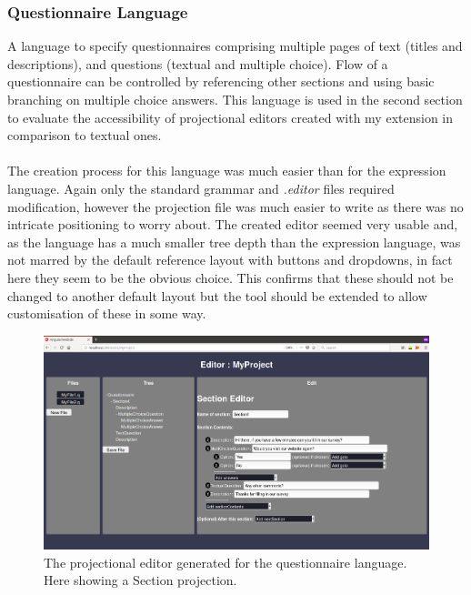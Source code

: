 \documentclass{article}
\begin{document}
{%

\subsubsection{Questionnaire Language}\label{questionnaireLang}
A language to specify questionnaires comprising multiple pages of text (titles and descriptions), and questions (textual and multiple choice). Flow of a questionnaire can be controlled by referencing other sections and using basic branching on multiple choice answers. This language is used in the second section to evaluate the accessibility of projectional editors created with my extension in comparison to textual ones.
\\
\\
The creation process for this language was much easier than for the expression language. Again only the standard grammar and \emph{.editor} files required modification, however the projection file was much easier to write as there was no intricate positioning to worry about. The created editor seemed very usable and, as the language has a much smaller tree depth than the expression language, was not marred by the default reference layout with buttons and dropdowns, in fact here they seem to be the obvious choice. This confirms that these should not be changed to another default layout but the tool should be extended to allow customisation of these in some way.
\begin{figure}[h!]
  \centering
  \includegraphics[width=\linewidth]{./Screenshots/questionnaireUI3.png}
  \caption{The projectional editor generated for the questionnaire language. Here showing a Section projection.}
  \label{fig:questionnaireUI}
\end{figure}

}
\end{document}

